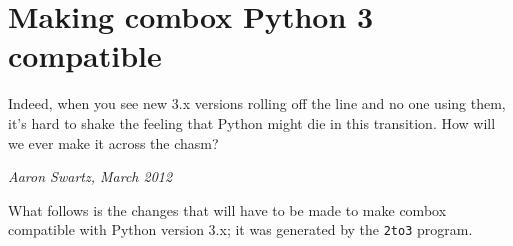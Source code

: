 \chapter{Making combox Python 3 compatible}\label{a-python3c}

\epigraph{Indeed, when you see new 3.x versions rolling off the line
  and no one using them, it’s hard to shake the feeling that Python
  might die in this transition. How will we ever make it across the
  chasm?}{\textit{Aaron Swartz, March 2012}}

What follows is the changes that will have to be made to make combox
compatible with Python version 3.x; it was generated by the
\verb+2to3+ program.


